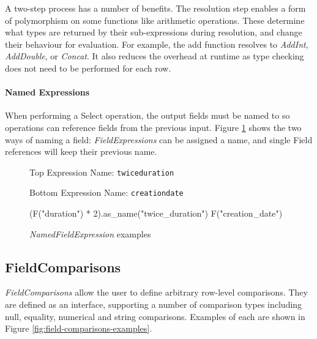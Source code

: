 A two-step process has a number of benefits. The resolution step enables a form of polymorphism on some functions like arithmetic operations. These determine what types are returned by their sub-expressions during resolution, and change their behaviour for evaluation. For example, the add function resolves to \textit{AddInt}, \textit{AddDouble}, or \textit{Concat}. It also reduces the overhead at runtime as type checking does not need to be performed for each row.

\paragraph{Named Expressions}
When performing a Select operation, the output fields must be named to so operations can reference fields from the previous input. Figure \ref{fig:namedfieldexpression-examples} shows the two ways of naming a field: \textit{FieldExpressions} can be assigned a name, and single Field references will keep their previous name.

\begin{figure}[htp]
	Top Expression Name: \texttt{twice\textunderscore duration}
	
	Bottom Expression Name: \texttt{creation\textunderscore date}
	\begin{python}
(F("duration") * 2).as_name("twice_duration")
F("creation_date")
	\end{python}
	\caption{\textit{NamedFieldExpression} examples}
	\label{fig:namedfieldexpression-examples}
\end{figure}

\pagebreak
\subsection{FieldComparisons}\label{subsec:fieldcomparisons}
\textit{FieldComparisons} allow the user to define arbitrary row-level comparisons. They are defined as an interface, supporting a number of comparison types including null, equality, numerical and string comparisons. Examples of each are shown in Figure \ref{fig:field-comparisons-examples}.

